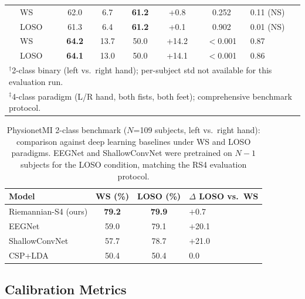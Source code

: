 \documentclass[11pt,a4paper]{article}
\begin{document}
\begin{table}[ht]
\begin{tabular}{@{}llcccccl@{}}
\addlinespace
\multirow{2}{*}{PhysionetMI$^\ddagger$ (4-cl., $N$=109)}
 & WS   & 62.0 & 6.7 & \textbf{61.2} & +0.8 & 0.252 & 0.11 (NS) \\
 & LOSO & 61.3 & 6.4 & \textbf{61.2} & +0.1 & 0.902 & 0.01 (NS) \\
\addlinespace
\multirow{2}{*}{Cho2017 (2-cl., $N$=52)}
 & WS   & \textbf{64.2} & 13.7 & 50.0 & +14.2 & $<$0.001 & 0.87 \\
 & LOSO & \textbf{64.1} & 13.0 & 50.0 & +14.1 & $<$0.001 & 0.86 \\
\bottomrule
\multicolumn{8}{l}{\footnotesize
$^\dagger$2-class binary (left vs.\ right hand); per-subject std not available
for this evaluation run.}\\
\multicolumn{8}{l}{\footnotesize
$^\ddagger$4-class paradigm (L/R hand, both fists, both feet);
comprehensive benchmark protocol.}
\end{tabular}
\end{table}

\begin{table}[ht]
\centering
\small
\caption{PhysionetMI 2-class benchmark ($N$=109 subjects, left vs.\ right hand):
comparison against deep learning baselines under WS and LOSO paradigms.
EEGNet and ShallowConvNet were pretrained on $N-1$ subjects for the LOSO
condition, matching the RS4 evaluation protocol.}
\label{tab:physionet_detail}
\begin{tabular}{@{}lccl@{}}
\toprule
\textbf{Model} & \textbf{WS (\%)} & \textbf{LOSO (\%)} &
\textbf{$\Delta$ LOSO vs.\ WS} \\
\midrule
Riemannian-S4 (ours) & \textbf{79.2} & \textbf{79.9} & $+$0.7 \\
EEGNet~\cite{Lawhern2018} & 59.0 & 79.1 & $+$20.1 \\
ShallowConvNet~\cite{Schirrmeister2017} & 57.7 & 78.7 & $+$21.0 \\
CSP+LDA~\cite{Blankertz2008} & 50.4 & 50.4 & 0.0 \\
\bottomrule
\end{tabular}
\end{table}

\subsection{Calibration Metrics}
\end{document}
